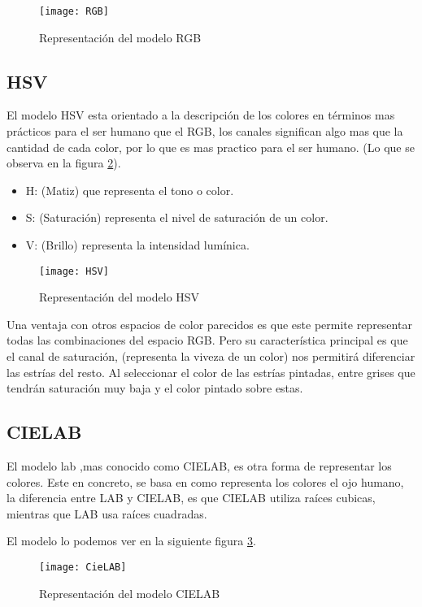 \begin{figure}[h]
\centering
\texttt{[image: RGB]}
\caption{Representación del modelo RGB~\cite{Manual:HAE}}
\label{fig:3.3}
\end{figure}

\subsection{HSV}
El modelo HSV \cite{modelo:hsv} esta orientado a la descripción de los colores en términos mas prácticos para el ser humano que el RGB, los canales significan algo mas que la cantidad de cada color, por lo que es mas practico para el ser humano. (Lo que se observa en la figura \ref{fig:3.4}).
 
\begin{itemize}
	\item H: (Matiz) que representa el tono o color.
	\item S: (Saturación) representa el nivel de saturación de un color.
	\item V: (Brillo) representa la intensidad lumínica.
\end{itemize}

\begin{figure}[h]
\centering
\texttt{[image: HSV]}
\caption{Representación del modelo HSV~\cite{Manual:HAE}}
\label{fig:3.4}
\end{figure}

Una ventaja con otros espacios de color parecidos es que este permite representar todas las combinaciones del espacio RGB.
Pero su característica principal es que el canal de saturación, (representa la viveza de un color) nos permitirá diferenciar las estrías del resto. Al seleccionar el color de las estrías pintadas, entre grises que tendrán saturación muy baja y el color pintado sobre estas.

\subsection{CIELAB}
El modelo lab \cite{wiki:lab},mas conocido como CIELAB, es otra forma de representar los colores. Este en concreto, se basa en como representa los colores el ojo humano, la diferencia entre LAB y CIELAB, es que CIELAB utiliza raíces cubicas, mientras que LAB usa raíces cuadradas.

El modelo lo podemos ver en la siguiente figura  \ref{fig:3.8}.

\begin{figure}[h]
\centering
\texttt{[image: CieLAB]}
\caption{Representación del modelo CIELAB~\cite{cie:LAB}}
\label{fig:3.8}
\end{figure}


